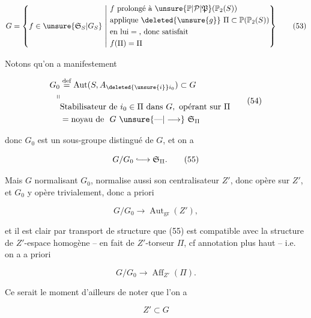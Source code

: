 \[
 G=\left\{f\in\unsure{\mathfrak S_S|G_S}\ \middle|\
 \begin{aligned}
 &f\text{ prolongé à }\unsure{\mathbb P|\mathcal P|\mathfrak P}(\mathbb P_2(S))\\
 &\text{applique }\deleted{\unsure{g}}\ \Pi\subset\mathbb P(\mathbb P_2(S))\\
 &\text{en lui}=\text{, donc satisfait}\\
 &f(\Pi)=\Pi
 \end{aligned}\right\} \tag*{(53)}
\]


  Notons qu'on a manifestement

\[
\begin{aligned}
G_0&\overset{\text{def}}{=}\operatorname{Aut}(S,A_{\deleted{\unsure{i}}i_0})\subset G\\[-2pt]
\shortparallel&\\[-2pt]
&\text{Stabilisateur de }i_0\in\Pi\text{ dans }G,\text{ opérant sur }\Pi\\
&=\text{noyau de }\ G\ \unsure{\text{---}|\longrightarrow}\ \mathfrak S_\Pi
\end{aligned}\tag*{(54)}
\]

donc $G_0$ est un sous-groupe distingué de $G$, et on a

\[
G/G_0\lhook\joinrel\longrightarrow\mathfrak S_\Pi. \tag*{(55)}
\]

Mais $G$ normalisant $G_0$, normalise aussi son centralisateur $Z'$, donc opère sur $Z'$, et $G_0$ y opère trivialement, donc a priori

\[
G/G_0\longrightarrow\operatorname{Aut}_{\mathrm{gr}}(Z'), \tag*{(56)}
\]

et il est clair par transport de structure que (55) est compatible avec la structure de $Z'$-espace homogène  -- en fait de $Z'$-torseur $\Pi$, cf annotation plus haut -- i.e. on a a priori

\[
G/G_0\longrightarrow\operatorname{Aff}_{Z'}(\Pi). \tag*{(57)}
\]

Ce serait le moment d'ailleurs de noter que l'on a

\[
Z'\subset G \tag*{(58)}
\]

